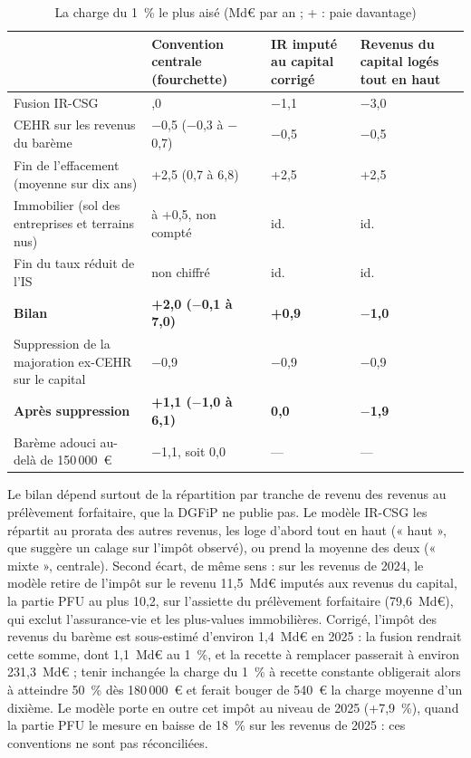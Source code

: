 \documentclass[11pt,a4paper]{article}
\begin{document}
\begin{table}[!htbp]\centering\scriptsize
\caption{La charge du 1~\% le plus aisé (Md€ par an ; + : paie davantage)}\label{tab:ens_haut}
\begin{tabularx}{\linewidth}{@{}>{\raggedright\arraybackslash}X>{\raggedright\arraybackslash}p{3.2cm}>{\raggedright\arraybackslash}p{2.6cm}>{\raggedright\arraybackslash}p{2.6cm}@{}}
\toprule
 & Convention centrale (fourchette) & IR imputé au capital corrigé & Revenus du capital logés tout en haut \\
\midrule
Fusion IR-CSG & 0,0 & $-$1,1 & $-$3,0 \\
CEHR sur les revenus du barème & $-$0,5 ($-$0,3 à $-$0,7) & $-$0,5 & $-$0,5 \\
Fin de l'effacement (moyenne sur dix ans) & +2,5 (0,7 à 6,8) & +2,5 & +2,5 \\
Immobilier (sol des entreprises et terrains nus) & 0 à +0,5, non compté & id. & id. \\
Fin du taux réduit de l'IS & non chiffré & id. & id. \\
\textbf{Bilan} & \textbf{+2,0 ($-$0,1 à 7,0)} & \textbf{+0,9} & \textbf{$-$1,0} \\
Suppression de la majoration ex-CEHR sur le capital & $-$0,9 & $-$0,9 & $-$0,9 \\
\textbf{Après suppression} & \textbf{+1,1 ($-$1,0 à 6,1)} & \textbf{0,0} & \textbf{$-$1,9} \\
Barème adouci au-delà de 150\,000~€ & $-$1,1, soit 0,0 & --- & --- \\
\bottomrule
\end{tabularx}
\par{}
\end{table}

Le bilan dépend surtout de la répartition par tranche de revenu des revenus au prélèvement forfaitaire, que la DGFiP ne
publie pas. Le modèle IR-CSG les répartit au prorata des autres revenus, les loge d'abord tout en haut (« haut », que
suggère un calage sur l'impôt observé), ou prend la moyenne des deux (« mixte », centrale). Second écart, de même sens :
sur les revenus de 2024, le modèle retire de l'impôt sur le revenu 11,5~Md€ imputés aux revenus du capital, la partie
PFU au plus 10,2, sur l'assiette du prélèvement forfaitaire (79,6~Md€), qui exclut l'assurance-vie et les plus-values
immobilières. Corrigé, l'impôt des revenus du barème est sous-estimé d'environ 1,4~Md€ en 2025 : la fusion rendrait
cette somme, dont 1,1~Md€ au 1~\%, et la recette à remplacer passerait à environ 231,3~Md€ ; tenir inchangée la charge du 1~\% à recette constante
obligerait alors à atteindre 50~\% dès 180\,000~€ et ferait bouger de 540~€ la charge moyenne d'un dixième. Le modèle porte en outre cet
impôt au niveau de 2025 (+7,9~\%), quand la partie PFU le mesure en baisse de 18~\% sur les revenus de 2025 : ces
conventions ne sont pas réconciliées.
\end{document}
